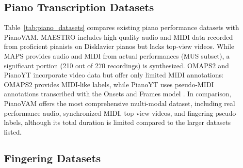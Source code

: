 \documentclass{article}
\newcommand{\jh}[1]{\textcolor{red}{#1}}
\begin{document}



\subsection{Piano Transcription Datasets}
Table~\ref{tab:piano_datasets} compares existing piano performance datasets with PianoVAM. MAESTRO \cite{ICLR19Hawthorne} includes high-quality audio and MIDI data recorded from proficient pianists on Disklavier pianos but lacks top-view videos. While MAPS \cite{Emiya2010} provides audio and MIDI from actual performances (MUS subset), a significant portion (210 out of 270 recordings) is synthesized. OMAPS2 \cite{ICASSPW23Li} and PianoYT \cite{ICASSP20Koepke} incorporate video data but offer only limited MIDI annotations: OMAPS2 provides MIDI-like labels, while PianoYT uses pseudo-MIDI annotations transcribed with the Onsets and Frames model \cite{ISMIR18Hawthorne}. In comparison, PianoVAM offers the most comprehensive multi-modal dataset, including real performance audio, synchronized MIDI, top-view videos, and fingering pseudo-labels, although its total duration is limited compared to the larger datasets listed.





\subsection{Fingering Datasets}
\end{document}
